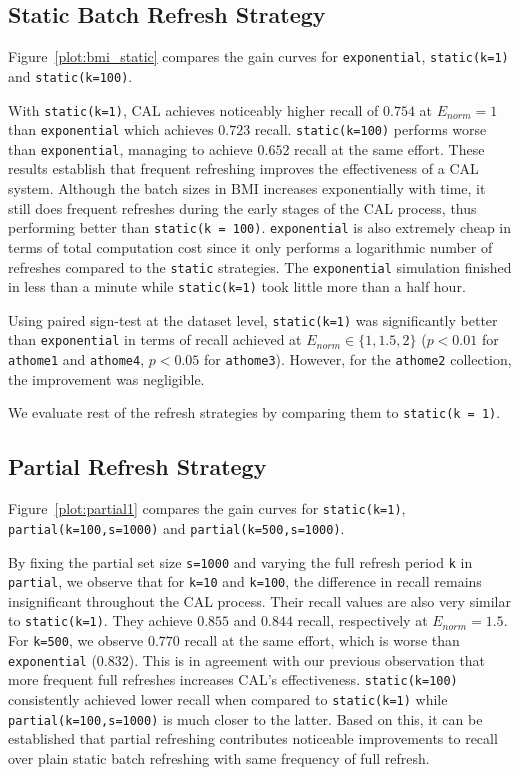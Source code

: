 \subsection*{Static Batch Refresh Strategy}
Figure~\ref{plot:bmi_static} compares the gain curves for \texttt{exponential},
\texttt{static(k=1)} and \texttt{static(k=100)}.

With \texttt{static(k=1)}, CAL achieves noticeably higher recall of
$0.754$ at $E_{norm} = 1$ than \texttt{exponential} which achieves $0.723$
recall.  \texttt{static(k=100)} performs worse than
\texttt{exponential}, managing to achieve $0.652$ recall at the same effort.
These results establish that frequent refreshing improves the effectiveness of a
CAL system.
Although the batch sizes in BMI increases exponentially with time, it still does
frequent refreshes during the early stages of the CAL process, thus performing
better than \texttt{static(k = 100)}. \texttt{exponential} is also
extremely cheap in terms of total computation cost since it only performs a
logarithmic number of refreshes compared to the \texttt{static} strategies.
The \texttt{exponential} simulation finished in less than a minute while
\texttt{static(k=1)} took little more than a half hour.

Using paired sign-test at the dataset level, \texttt{static(k=1)} was significantly better than
\texttt{exponential} in terms of
recall achieved at $E_{norm} \in \{1,1.5,2\}$
($p < 0.01$ for \texttt{athome1} and \texttt{athome4}, $p < 0.05$ for
\texttt{athome3}). However, for the \texttt{athome2} collection, the improvement was negligible.

We evaluate rest of the refresh strategies by comparing them to
\texttt{static(k = 1)}.

\subsection*{Partial Refresh Strategy}
Figure~\ref{plot:partial1} compares the gain curves for
\texttt{static(k=1)}, \texttt{partial(k=100,s=1000)} and
\texttt{partial(k=500,s=1000)}.

By fixing the partial set size \texttt{s=1000} and varying the full refresh
period \texttt{k} in \texttt{partial}, we observe
that for \texttt{k=10} and \texttt{k=100}, the difference in recall remains insignificant throughout the
CAL process. Their recall values are also very similar to
\texttt{static(k=1)}. They achieve $0.855$ and $0.844$ recall, respectively at
$E_{norm} = 1.5$. For \texttt{k=500}, we observe $0.770$ recall at the
same effort, which is worse than \texttt{exponential} ($0.832$). This is in
agreement with our previous observation that more frequent full refreshes
increases CAL's effectiveness. \texttt{static(k=100)}
consistently achieved lower recall when compared to \texttt{static(k=1)} while
\texttt{partial(k=100,s=1000)} is much closer to the latter. Based
on this, it can be established that partial refreshing contributes noticeable
improvements to recall over plain static batch refreshing with same 
frequency of full refresh.

